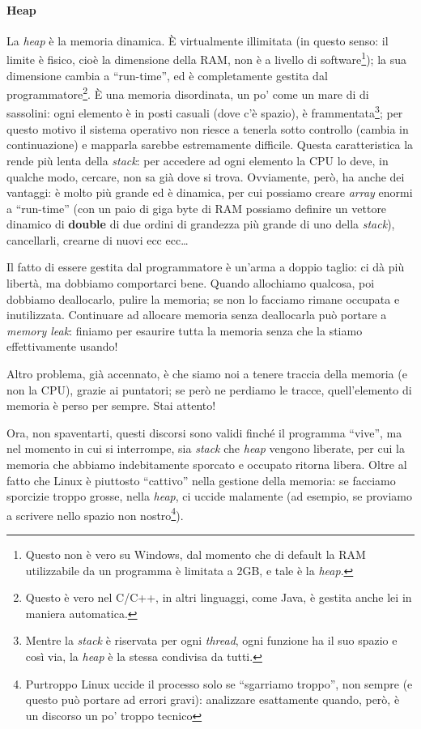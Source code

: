 \begin{small}
 \paragraph{Heap} La \emph{heap} è la memoria dinamica. È virtualmente illimitata (in questo senso: il limite è fisico, cioè la dimensione della RAM, non è a livello di software\footnote{Questo non è vero su Windows, dal momento che di default la RAM utilizzabile da un programma è limitata a 2GB, e tale è la \emph{heap}.}); la sua dimensione cambia a ``run-time'', ed è completamente gestita dal programmatore\footnote{Questo è vero nel C/C++, in altri linguaggi, come Java, è gestita anche lei in maniera automatica.}. È una memoria disordinata, un po' come un mare di di sassolini: ogni elemento è in posti casuali (dove c'è spazio), è frammentata\footnote{Mentre la \emph{stack} è riservata per ogni \emph{thread}, ogni funzione ha il suo spazio e così via, la \emph{heap} è la stessa condivisa da tutti.}; per questo motivo il sistema operativo non riesce a tenerla sotto controllo (cambia in continuazione) e mapparla sarebbe estremamente difficile. Questa caratteristica la rende più lenta della \emph{stack}: per accedere ad ogni elemento la CPU lo deve, in qualche modo, cercare, non sa già dove si trova. Ovviamente, però, ha anche dei vantaggi: è molto più grande ed è dinamica, per cui possiamo creare \emph{array} enormi a ``run-time'' (con un paio di giga byte di RAM possiamo definire un vettore dinamico di \textbf{double}  di due ordini di grandezza più grande di uno della \emph{stack}), cancellarli, crearne di nuovi ecc ecc\ldots 
 
 Il fatto di essere gestita dal programmatore è un'arma a doppio taglio: ci dà più libertà, ma dobbiamo comportarci bene. Quando allochiamo qualcosa, poi dobbiamo deallocarlo, pulire la memoria; se non lo facciamo rimane occupata e inutilizzata. Continuare ad allocare memoria senza deallocarla può portare a \emph{memory leak}: finiamo per esaurire tutta la memoria senza che la stiamo effettivamente usando!
 
 Altro problema, già accennato, è che siamo noi a tenere traccia della memoria (e non la CPU), grazie ai puntatori; se però ne perdiamo le tracce, quell'elemento di memoria è perso per sempre. Stai attento!
 
 Ora, non spaventarti, questi discorsi sono validi finché il programma ``vive'', ma nel momento in cui si interrompe, sia \emph{stack} che \emph{heap} vengono liberate, per cui la memoria che abbiamo indebitamente sporcato e occupato ritorna libera. Oltre al fatto che Linux è piuttosto ``cattivo'' nella gestione della memoria: se facciamo sporcizie troppo grosse, nella \emph{heap}, ci uccide malamente (ad esempio, se proviamo a scrivere nello spazio non nostro\footnote{Purtroppo Linux uccide il processo solo se ``sgarriamo troppo'', non sempre (e questo può portare ad errori gravi): analizzare esattamente quando, però, è un discorso un po' troppo tecnico}).  
 \end{small}
